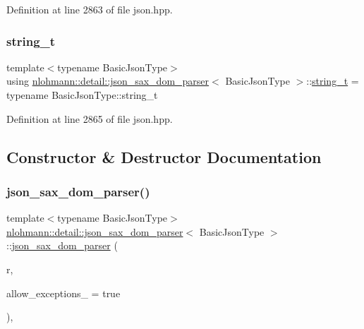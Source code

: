 Definition at line 2863 of file json.\+hpp.

\mbox{\label{classnlohmann_1_1detail_1_1json__sax__dom__parser_afd4d961ab2a6b01cbe6e840f7fb90cdc}} 
\subsubsection{\texorpdfstring{string\_t}{string\_t}}
{\footnotesize\ttfamily template$<$typename Basic\+Json\+Type$>$ \\
using \mbox{\hyperlink{classnlohmann_1_1detail_1_1json__sax__dom__parser}{nlohmann\+::detail\+::json\+\_\+sax\+\_\+dom\+\_\+parser}}$<$ Basic\+Json\+Type $>$\+::\mbox{\hyperlink{classnlohmann_1_1detail_1_1json__sax__dom__parser_afd4d961ab2a6b01cbe6e840f7fb90cdc}{string\+\_\+t}} =  typename Basic\+Json\+Type\+::string\+\_\+t}



Definition at line 2865 of file json.\+hpp.



\subsection{Constructor \& Destructor Documentation}
\mbox{\label{classnlohmann_1_1detail_1_1json__sax__dom__parser_afc50fee0a92ce84afb84041ebbdfba80}} 
\subsubsection{\texorpdfstring{json\_sax\_dom\_parser()}{json\_sax\_dom\_parser()}\hspace{0.1cm}{\footnotesize\ttfamily [1/3]}}
{\footnotesize\ttfamily template$<$typename Basic\+Json\+Type$>$ \\
\mbox{\hyperlink{classnlohmann_1_1detail_1_1json__sax__dom__parser}{nlohmann\+::detail\+::json\+\_\+sax\+\_\+dom\+\_\+parser}}$<$ Basic\+Json\+Type $>$\+::\mbox{\hyperlink{classnlohmann_1_1detail_1_1json__sax__dom__parser}{json\+\_\+sax\+\_\+dom\+\_\+parser}} (\begin{DoxyParamCaption}\item[{Basic\+Json\+Type \&}]{r,  }\item[{const bool}]{allow\+\_\+exceptions\+\_\+ = {\ttfamily true} }\end{DoxyParamCaption})\hspace{0.3cm}{\ttfamily [inline]}, {\ttfamily [explicit]}}


